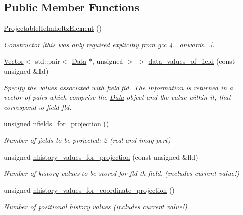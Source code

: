 \subsection*{Public Member Functions}
\begin{DoxyCompactItemize}
\item 
\hyperlink{classoomph_1_1ProjectableHelmholtzElement_a2432f702db869a4a50bec026b5fabc7b}{Projectable\+Helmholtz\+Element} ()
\begin{DoxyCompactList}\small\item\em Constructor \mbox{[}this was only required explicitly from gcc 4.. onwards...\mbox{]}. \end{DoxyCompactList}\item 
\hyperlink{classoomph_1_1Vector}{Vector}$<$ std\+::pair$<$ \hyperlink{classoomph_1_1Data}{Data} $\ast$, unsigned $>$ $>$ \hyperlink{classoomph_1_1ProjectableHelmholtzElement_a8ca133993658d3eefdfd1ab02b55fae7}{data\+\_\+values\+\_\+of\+\_\+field} (const unsigned \&fld)
\begin{DoxyCompactList}\small\item\em Specify the values associated with field fld. The information is returned in a vector of pairs which comprise the \hyperlink{classoomph_1_1Data}{Data} object and the value within it, that correspond to field fld. \end{DoxyCompactList}\item 
unsigned \hyperlink{classoomph_1_1ProjectableHelmholtzElement_a8a516cbf286391aa6e3c0651db47de6f}{nfields\+\_\+for\+\_\+projection} ()
\begin{DoxyCompactList}\small\item\em Number of fields to be projected\+: 2 (real and imag part) \end{DoxyCompactList}\item 
unsigned \hyperlink{classoomph_1_1ProjectableHelmholtzElement_aae069d7dba3ab7ae1677053e5c55ba93}{nhistory\+\_\+values\+\_\+for\+\_\+projection} (const unsigned \&fld)
\begin{DoxyCompactList}\small\item\em Number of history values to be stored for fld-\/th field. (includes current value!) \end{DoxyCompactList}\item 
unsigned \hyperlink{classoomph_1_1ProjectableHelmholtzElement_a4ec9aaa5311ce1724014c4c4240a4d59}{nhistory\+\_\+values\+\_\+for\+\_\+coordinate\+\_\+projection} ()
\begin{DoxyCompactList}\small\item\em Number of positional history values (includes current value!) \end{DoxyCompactList}\item 

\end{DoxyCompactItemize}
